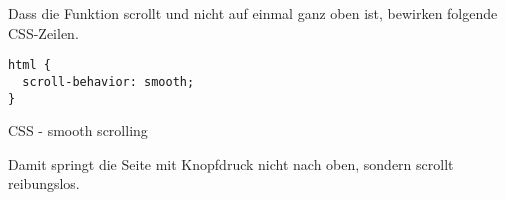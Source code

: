 Dass die Funktion scrollt und nicht auf einmal ganz oben ist, bewirken folgende CSS-Zeilen.

\begin{code}[htp]
\begin{lstlisting}
html {
  scroll-behavior: smooth;
}
\end{lstlisting}
\caption{CSS - smooth scrolling}
\end{code}

Damit springt die Seite mit Knopfdruck nicht nach oben, sondern scrollt reibungslos.